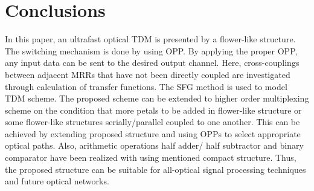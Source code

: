 \documentclass{osa-article}
\begin{document}
\begin{table}[H]
\caption{The parameters of flower-like structure  as half subtractor.}
\centering 
{}
\label{tab6} %
\end{table}

\section{Conclusions}
\label{}
In this paper, an ultrafast optical TDM is presented by a flower-like structure. The switching mechanism is done by using OPP. By applying the proper OPP, any input data can be sent to the desired output channel. Here, cross-couplings between adjacent MRRs that have not been directly coupled are investigated through calculation of transfer functions. The SFG method is used to model TDM scheme. The proposed scheme can be extended to higher order multiplexing scheme on the condition that more petals to be added in flower-like structure or some flower-like structures serially/parallel coupled to one another. This can be achieved by extending proposed structure and using OPPs to select appropriate optical paths. Also, arithmetic operations half adder/ half subtractor and binary comparator have been realized with using mentioned compact structure. Thus, the proposed structure can be suitable for all-optical signal processing techniques and future optical networks.
\end{document}
